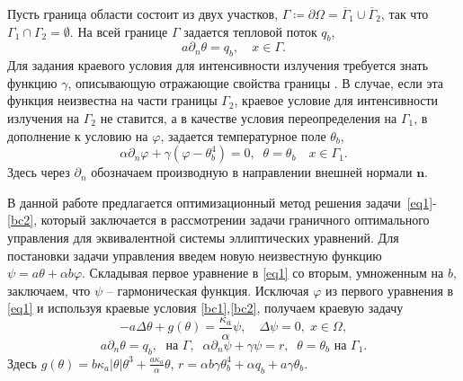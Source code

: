 \documentclass[12pt]{article}
\begin{document}
    Пусть граница области состоит из двух участков, $\Gamma \coloneqq \partial \Omega =\overline{\Gamma}_1 \cup \overline{\Gamma}_2$,
    так что $\Gamma_1 \cap \Gamma_2 =  \emptyset$.
    На всей границе $\Gamma$ задается тепловой поток $q_b$,
    \begin{equation}
        \label{bc1}
        a\partial_n\theta = q_b, \quad x\in \Gamma.
    \end{equation}
    Для задания краевого условия для интенсивности излучения
    требуется знать функцию $\gamma$, описывающую отражающие свойства границы \cite{JVM-14}.
    В случае, если эта функция неизвестна на части границы $\Gamma_2$,
    краевое условие для интенсивности излучения на $\Gamma_2$ не ставится, а в качестве условия переопределения на $\Gamma_1$, в дополнение к условию на
    $\varphi$, задается температурное поле $\theta_b$,
    \begin{equation}
        \label{bc2}
        \alpha\partial_n\varphi + \gamma (\varphi - \theta_b ^4 ) = 0,\;\;
        \theta=\theta_b\quad x\in \Gamma_1.
    \end{equation}
    Здесь через $\partial_n$ обозначаем производную в направлении
    внешней нормали $\mathbf n$.

    В данной работе предлагается оптимизационный метод решения задачи~\eqref{eq1}-\eqref{bc2}, который заключается в рассмотрении задачи граничного оптимального управления для эквивалентной системы эллиптических уравнений.
    Для постановки задачи управления введем новую неизвестную функцию
    $\psi= a\theta + \alpha b \varphi$. Складывая первое уравнение в \eqref{eq1} со вторым, умноженным на $b$, заключаем, что $\psi$ -- гармоническая функция.
    Исключая $\varphi$ из первого уравнения в \eqref{eq1} и используя краевые условия
    \eqref{bc1},\eqref{bc2},  получаем краевую задачу
    \begin{equation}
        \label{eq2}
        - a \Delta \theta + g (\theta) = \frac{\kappa_a}{\alpha}\psi, \quad
        \Delta \psi = 0, \; x \in \Omega,
    \end{equation}
    \begin{equation}
        \label{bc3}
        a \partial_n \theta = q_b, \; \text{ на }\Gamma, \;\;
        \alpha \partial_n \psi + \gamma \psi  =  r,\;\;
        \theta = \theta_b  \text{ на }\Gamma_1.
    \end{equation}
    Здесь $g(\theta) = b \kappa_a|\theta|\theta^3 + \frac{a\kappa_a}{\alpha}\theta$, $r=\alpha b \gamma \theta_b^4+ \alpha q_b + a \gamma \theta_b$.
\end{document}
